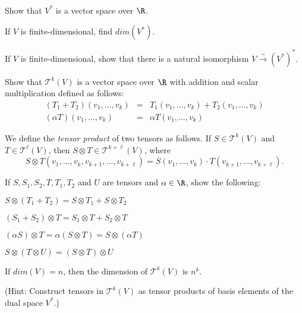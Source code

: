 \documentclass{book}
\begin{document}
\begin{exercise}\
\begin{exerenm}
\item
Show that $V^*$ is a vector space over $\R$.

\item
If $V$ is finite-dimensional, find $dim(V^*)$.

\item
If $V$ is finite-dimensional, show that there is a natural isomorphism 
$V\overset{\sim}\longrightarrow (V^*)^*$.
\end{exerenm}
\end{exercise}

\begin{exercise}
Show that $\mathcal{T}^k(V)$ is a vector space over $\R$ with addition and scalar multiplication 
defined as follows:
\begin{eqnarray*}
(T_1+T_2)(v_1, \ldots, v_k) &=& T_1(v_1, \ldots, v_k)+T_2(v_1, \ldots, v_k) \\
(\alpha T)(v_1, \ldots, v_k) &=& \alpha T(v_1, \ldots, v_k) 
\end{eqnarray*}
\end{exercise}

\begin{definition} 
We define the {\em tensor product} of two tensors as follows.
If $S\in\mathcal{T}^k(V)$ and $T\in\mathcal{T}^\ell(V)$, then $S\otimes T\in\mathcal{T}^{k+\ell}(V)$,
where
$$
S\otimes T(v_1, \ldots, v_k, v_{k+1}, \ldots, v_{k+\ell})=S(v_1, \ldots, v_k)\cdot T(v_{k+1}, \ldots, v_{k+\ell}).
$$
\end{definition}

\begin{exercise}
If $S, S_1, S_2, T, T_1, T_2$ and $U$ are tensors and $\alpha\in\R$, show the following:
\begin{exerenm}
\item  $S\otimes (T_1+T_2) = S\otimes T_1 + S\otimes T_2$

\item  $(S_1+S_2)\otimes T= S_1\otimes T+S_2\otimes T$

\item  $(\alpha S)\otimes T=\alpha (S\otimes T)=S\otimes (\alpha T)$

\item  $S\otimes (T\otimes U)=(S\otimes T)\otimes U$
\end{exerenm}
\end{exercise}

\begin{theorem}
If $dim(V)=n$, then the dimension of $\mathcal{T}^k(V)$ is $n^k$.
\end{theorem}
(Hint:  Construct tensors in $\mathcal{T}^k(V)$ as tensor products of basis elements of
the dual space $V^*$.)
\end{document}
